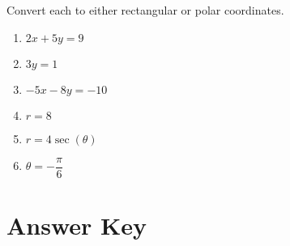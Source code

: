 Convert each to either rectangular or polar coordinates.
\begin{multicols}{3}
\begin{enumerate}		\setcounter{enumi}{\value{Review}}
	\item $2x + 5y = 9$
    \item $3y = 1$
    \item $-5x - 8y = -10$
    \item $r = 8$
    \item $r = 4\sec(\theta)$
    \item $\theta = -\dfrac{\pi}{6}$
\end{enumerate}	\setcounter{Review}{\value{enumi}}
\end{multicols}

\newpage

\section{Answer Key}

